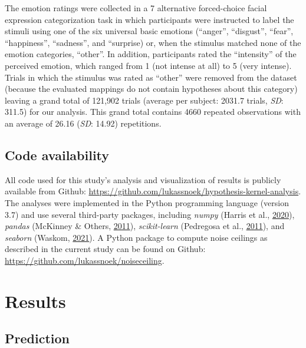 \documentclass[11pt,american,a4paper,oneside,]{memoir} %
\begin{document}
The emotion ratings were collected in a 7 alternative forced-choice facial expression categorization task in which participants were instructed to label the stimuli using one of the six universal basic emotions (``anger'', ``disgust'', ``fear'', ``happiness'', ``sadness'', and ``surprise) or, when the stimulus matched none of the emotion categories, ``other''. In addition, participants rated the ``intensity'' of the perceived emotion, which ranged from 1 (not intense at all) to 5 (very intense). Trials in which the stimulus was rated as ``other'' were removed from the dataset (because the evaluated mappings do not contain hypotheses about this category) leaving a grand total of 121,902 trials (average per subject: 2031.7 trials, \emph{SD}: 311.5) for our analysis. This grand total contains 4660 repeated observations with an average of 26.16 (\emph{SD}: 14.92) repetitions.

\hypertarget{hka-code}{%
\subsection{Code availability}\label{hka-code}}

All code used for this study's analysis and visualization of results is publicly available from Github: \url{https://github.com/lukassnoek/hypothesis-kernel-analysis}. The analyses were implemented in the Python programming language (version 3.7) and use several third-party packages, including \emph{numpy} (Harris et al., \protect\hyperlink{ref-Harris2020-en}{2020}), \emph{pandas} (McKinney \& Others, \protect\hyperlink{ref-McKinney2011-kl}{2011}), \emph{scikit-learn} (Pedregosa et al., \protect\hyperlink{ref-pedregosa2011scikit}{2011}), and \emph{seaborn} (Waskom, \protect\hyperlink{ref-waskom2021seaborn}{2021}). A Python package to compute noise ceilings as described in the current study can be found on Github: \url{https://github.com/lukassnoek/noiseceiling}.

\hypertarget{hka-results}{%
\section{Results}\label{hka-results}}

\hypertarget{prediction}{%
\subsection{Prediction}\label{prediction}}
\end{document}
